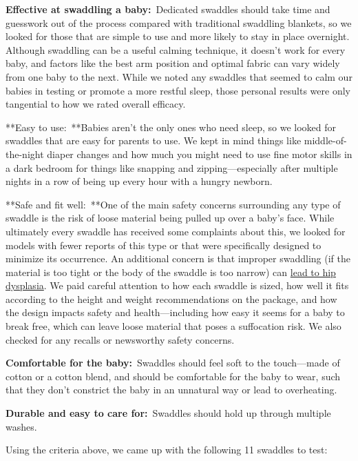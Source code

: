 \textbf{Effective at swaddling a baby:}~Dedicated swaddles should take
time and guesswork out of the process compared with traditional
swaddling blankets, so we looked for those that are simple to use and
more likely to stay in place overnight. Although swaddling can be a
useful calming technique, it doesn't work for every baby, and factors
like the best arm position and optimal fabric can vary widely from one
baby to the next. While we noted any swaddles that seemed to calm our
babies in testing or promote a more restful sleep, those personal
results were only tangential to how we rated overall efficacy.

**Easy to use:~**Babies aren't the only ones who need sleep, so we
looked for swaddles that are easy for parents to use. We kept in mind
things like middle-of-the-night diaper changes and how much you might
need to use fine motor skills in a dark bedroom for things like snapping
and zipping---especially after multiple nights in a row of being up
every hour with a hungry newborn.

**Safe and fit well:~**One of the main safety concerns surrounding any
type of swaddle is the risk of loose material being pulled up over a
baby's face. While ultimately every swaddle has received some complaints
about this, we looked for models with fewer reports of this type or that
were specifically designed to minimize its occurrence. An additional
concern is that improper swaddling (if the material is too tight or the
body of the swaddle is too narrow) can
\href{https://hipdysplasia.org/developmental-dysplasia-of-the-hip/hip-healthy-swaddling/}{lead
to hip dysplasia}. We paid careful attention to how each swaddle is
sized, how well it fits according to the height and weight
recommendations on the package, and how the design impacts safety and
health---including how easy it seems for a baby to break free, which can
leave loose material that poses a suffocation risk. We also checked for
any recalls or newsworthy safety concerns.

\textbf{Comfortable for the baby:}~Swaddles should feel soft to the
touch---made of cotton or a cotton blend, and should be comfortable for
the baby to wear, such that they don't constrict the baby in an
unnatural way or lead to overheating.

\textbf{Durable and easy to care for:}~Swaddles should hold up through
multiple washes.

Using the criteria above, we came up with the following 11 swaddles to
test:

